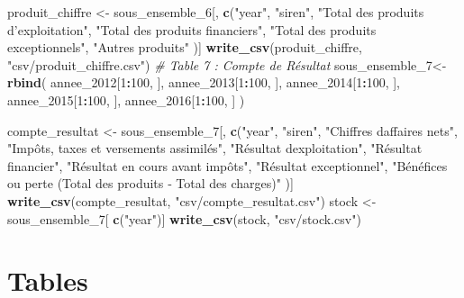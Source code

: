 \documentclass[mstat,12pt]{unswthesis}
\newenvironment{Shaded}{\begin{snugshade}}{\end{snugshade}}
\newcommand{\CommentTok}[1]{\textcolor[rgb]{0.56,0.35,0.01}{\textit{#1}}}
\newcommand{\DecValTok}[1]{\textcolor[rgb]{0.00,0.00,0.81}{#1}}
\newcommand{\FunctionTok}[1]{\textcolor[rgb]{0.13,0.29,0.53}{\textbf{#1}}}
\newcommand{\NormalTok}[1]{#1}
\newcommand{\OtherTok}[1]{\textcolor[rgb]{0.56,0.35,0.01}{#1}}
\newcommand{\SpecialCharTok}[1]{\textcolor[rgb]{0.81,0.36,0.00}{\textbf{#1}}}
\newcommand{\StringTok}[1]{\textcolor[rgb]{0.31,0.60,0.02}{#1}}
\begin{document}
\begin{Shaded}
\begin{Highlighting}[]
\NormalTok{produit\_chiffre }\OtherTok{\textless{}{-}}\NormalTok{ sous\_ensemble\_6[, }\FunctionTok{c}\NormalTok{(}\StringTok{"year"}\NormalTok{,}
  \StringTok{"siren"}\NormalTok{, }
  \StringTok{"Total des produits d’exploitation"}\NormalTok{, }
  \StringTok{"Total des produits financiers"}\NormalTok{, }
  \StringTok{"Total des produits exceptionnels"}\NormalTok{, }
  \StringTok{"Autres produits"}
\NormalTok{)]}
\FunctionTok{write\_csv}\NormalTok{(produit\_chiffre, }\StringTok{"csv/produit\_chiffre.csv"}\NormalTok{)}
\CommentTok{\# Table 7 : Compte de Résultat}
\NormalTok{sous\_ensemble\_7}\OtherTok{\textless{}{-}} \FunctionTok{rbind}\NormalTok{(}
\NormalTok{  annee\_2012[}\DecValTok{1}\SpecialCharTok{:}\DecValTok{100}\NormalTok{, ],}
\NormalTok{  annee\_2013[}\DecValTok{1}\SpecialCharTok{:}\DecValTok{100}\NormalTok{, ],}
\NormalTok{  annee\_2014[}\DecValTok{1}\SpecialCharTok{:}\DecValTok{100}\NormalTok{, ],}
\NormalTok{  annee\_2015[}\DecValTok{1}\SpecialCharTok{:}\DecValTok{100}\NormalTok{, ],}
\NormalTok{  annee\_2016[}\DecValTok{1}\SpecialCharTok{:}\DecValTok{100}\NormalTok{, ]}
\NormalTok{)}

\NormalTok{compte\_resultat }\OtherTok{\textless{}{-}}\NormalTok{ sous\_ensemble\_7[, }\FunctionTok{c}\NormalTok{(}\StringTok{"year"}\NormalTok{,}
  \StringTok{"siren"}\NormalTok{, }
  \StringTok{"Chiffres d\textquotesingle{}affaires nets"}\NormalTok{, }
  \StringTok{"Impôts, taxes et versements assimilés"}\NormalTok{, }
  \StringTok{"Résultat d\textquotesingle{}exploitation"}\NormalTok{, }
  \StringTok{"Résultat financier"}\NormalTok{, }
  \StringTok{"Résultat en cours avant impôts"}\NormalTok{, }
  \StringTok{"Résultat exceptionnel"}\NormalTok{, }
  \StringTok{"Bénéfices ou perte (Total des produits ‐ Total des charges)"}
\NormalTok{)]}
\FunctionTok{write\_csv}\NormalTok{(compte\_resultat, }\StringTok{"csv/compte\_resultat.csv"}\NormalTok{)}
\NormalTok{stock }\OtherTok{\textless{}{-}}\NormalTok{ sous\_ensemble\_7[ }\FunctionTok{c}\NormalTok{(}\StringTok{"year"}\NormalTok{)]}
\FunctionTok{write\_csv}\NormalTok{(stock, }\StringTok{"csv/stock.csv"}\NormalTok{)}
\end{Highlighting}
\end{Shaded}

\normalsize

\section*{\texorpdfstring{\textbf{Tables}}{Tables}}\label{tables}
\end{document}
